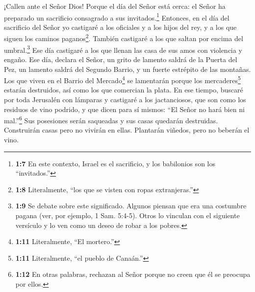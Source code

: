  ¡Callen ante el Señor Dios! Porque el día del Señor está
cerca: el Señor ha preparado un sacrificio consagrado a sus
invitados.\footnote{\textbf{1:7} En este contexto, Israel es el
  sacrificio, y los babilonios son los ``invitados.''} 
Entonces, en el día del sacrificio del Señor yo castigaré a los
oficiales y a los hijos del rey, y a los que siguen los caminos
paganos\footnote{\textbf{1:8} Literalmente, ``los que se visten con
  ropas extranjeras.''}.  También castigaré a los que saltan
por encima del umbral.\footnote{\textbf{1:9} Se debate sobre este
  significado. Algunos piensan que era una costumbre pagana (ver, por
  ejemplo, 1 Sam. 5:4-5). Otros lo vinculan con el siguiente versículo y
  lo ven como un deseo de robar a los pobres.} Ese día castigaré a los
que llenan las casa de sus amos con violencia y engaño. 
Ese día, declara el Señor, un grito de lamento saldrá de la Puerta del
Pez, un lamento saldrá del Segundo Barrio, y un fuerte estrépito de las
montañas.  Los que viven en el Barrio del
Mercado\footnote{\textbf{1:11} Literalmente, ``El mortero.''} se
lamentarán porque los mercaderes\footnote{\textbf{1:11} Literalmente,
  ``el pueblo de Canaán.''} estarán destruidos, así como los que
comercian la plata.  En ese tiempo, buscaré por toda
Jerusalén con lámparas y castigaré a los jactanciosos, que son como los
residuos de vino podrido, y que dicen para sí mismos: ``El Señor no hará
bien ni mal.''\footnote{\textbf{1:12} En otras palabras, rechazan al
  Señor porque no creen que él se preocupa por ellos.}  Sus
posesiones serán saqueadas y sus casas quedarán destruidas. Construirán
casas pero no vivirán en ellas. Plantarán viñedos, pero no beberán el
vino.

